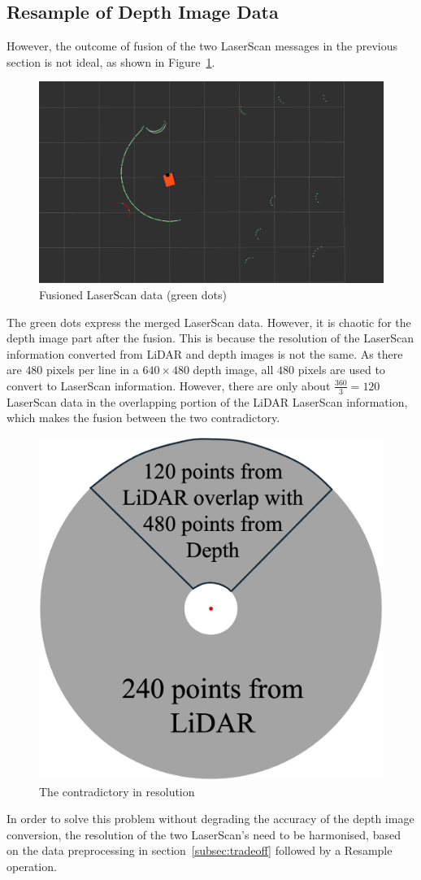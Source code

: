 \subsection{Resample of Depth Image Data}
However, the outcome of fusion of the two LaserScan messages in the previous section is not ideal, as shown in Figure~\ref{fig:fusioned}.
\begin{figure}[H]
    \centering
    \includegraphics[width=0.75\linewidth]{figs/before_resample.png}
    \caption{Fusioned LaserScan data (green dots)}
    \label{fig:fusioned}
\end{figure}
The green dots express the merged LaserScan data. However, it is chaotic for the depth image part after the fusion.
This is because the resolution of the LaserScan information converted from LiDAR and depth images is not the same. 
As there are $480$ pixels per line in a $640\times480$ depth image, 
all $480$ pixels are used to convert to LaserScan information. 
However, there are only about $\frac{360}{3}=120$ LaserScan data in the overlapping portion of the LiDAR LaserScan information, 
which makes the fusion between the two contradictory.
\begin{figure}[H]
    \centering
    \includegraphics[width=0.4\linewidth]{figs/contradictory.png}
    \caption{The contradictory in resolution}
\end{figure}
In order to solve this problem without degrading the accuracy of the depth image conversion, 
the resolution of the two LaserScan's need to be harmonised,
based on the data preprocessing in section~\ref{subsec:tradeoff} followed by a Resample operation.

